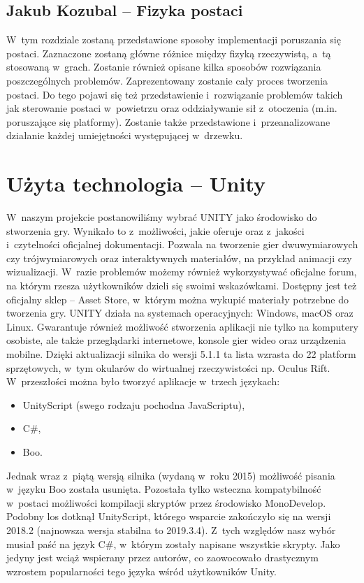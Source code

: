 \documentclass[oneside,polski,logo]{amuthesis}
\begin{document}
\subsection{Jakub Kozubal – Fizyka postaci}
W~tym rozdziale zostaną przedstawione sposoby implementacji poruszania się postaci. Zaznaczone zostaną główne różnice między fizyką rzeczywistą, a~tą stosowaną w~grach. Zostanie również opisane kilka sposobów rozwiązania poszczególnych problemów. Zaprezentowany zostanie cały proces tworzenia postaci. Do tego pojawi się też przedstawienie i~rozwiązanie problemów takich jak sterowanie postaci w~powietrzu oraz oddziaływanie sił z~otoczenia (m.in. poruszające się platformy). Zostanie także przedstawione i~przeanalizowane działanie każdej umiejętności występującej w~drzewku.

\section{Użyta technologia – Unity}
W~naszym projekcie postanowiliśmy wybrać UNITY jako środowisko do stworzenia gry. Wynikało to z~możliwości, jakie oferuje oraz z~jakości i~czytelności oficjalnej dokumentacji. Pozwala na tworzenie gier dwuwymiarowych czy trójwymiarowych oraz interaktywnych materiałów, na przykład animacji czy wizualizacji. W~razie problemów możemy również wykorzystywać oficjalne forum, na którym rzesza użytkowników dzieli się swoimi wskazówkami. Dostępny jest też oficjalny sklep – Asset Store, w~którym można wykupić materiały potrzebne do tworzenia gry. UNITY działa na systemach operacyjnych: Windows, macOS oraz Linux. Gwarantuje również możliwość stworzenia aplikacji nie tylko na komputery osobiste, ale także przeglądarki internetowe, konsole gier wideo oraz urządzenia mobilne. Dzięki aktualizacji silnika do wersji 5.1.1 ta lista wzrasta do 22 platform sprzętowych, w~tym okularów do wirtualnej rzeczywistości np. Oculus Rift.
W~przeszłości można było tworzyć aplikacje w~trzech językach:
\begin{itemize}
\item UnityScript (swego rodzaju pochodna JavaScriptu),
\item C\#,
\item Boo.
\end{itemize}
Jednak wraz z~piątą wersją silnika (wydaną w~roku 2015) możliwość pisania w~języku Boo została usunięta. Pozostała tylko wsteczna kompatybilność w~postaci możliwości kompilacji skryptów przez środowisko MonoDevelop. Podobny los dotknął UnityScript, którego wsparcie zakończyło się na wersji 2018.2 (najnowsza wersja stabilna to 2019.3.4). Z~tych względów nasz wybór musiał paść na język C\#, w~którym zostały napisane wszystkie skrypty. Jako jedyny jest wciąż wspierany przez autorów, co zaowocowało drastycznym wzrostem popularności tego języka wśród użytkowników Unity. \cite{unity}
\end{document}
